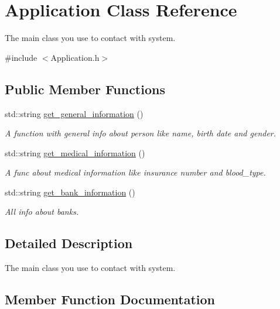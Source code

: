\hypertarget{classApplication}{}\section{Application Class Reference}
\label{classApplication}


The main class you use to contact with system.  




{\ttfamily \#include $<$Application.\+h$>$}

\subsection*{Public Member Functions}
\begin{DoxyCompactItemize}
\item 
std\+::string \mbox{\hyperlink{classApplication_a5e74a6dd312571caae7ad5009ed80864}{get\+\_\+general\+\_\+information}} ()
\begin{DoxyCompactList}\small\item\em A function with general info about person like name, birth date and gender. \end{DoxyCompactList}\item 
std\+::string \mbox{\hyperlink{classApplication_ade6d895ba440d17e12b21baf93bc8312}{get\+\_\+medical\+\_\+information}} ()
\begin{DoxyCompactList}\small\item\em A func about medical information like insurance number and blood\+\_\+type. \end{DoxyCompactList}\item 
std\+::string \mbox{\hyperlink{classApplication_a7900e26bc4f0e728af2f09f231d4d930}{get\+\_\+bank\+\_\+information}} ()
\begin{DoxyCompactList}\small\item\em All info about banks. \end{DoxyCompactList}\end{DoxyCompactItemize}


\subsection{Detailed Description}
The main class you use to contact with system. 

\subsection{Member Function Documentation}
\mbox{\label{classApplication_a7900e26bc4f0e728af2f09f231d4d930}} 
